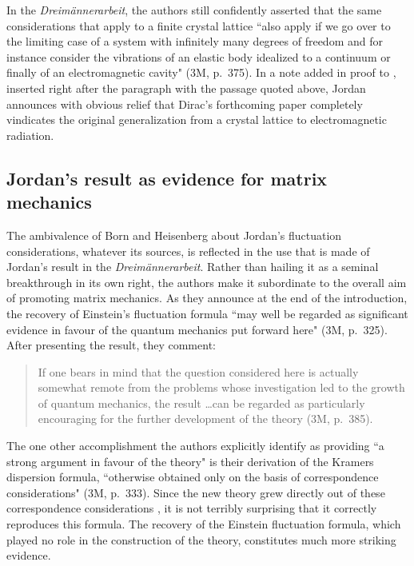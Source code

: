 \documentclass[12pt]{elsart}
\begin{document}
In the {\it Dreim\"annerarbeit}, the authors still confidently asserted that the same considerations that apply to a finite crystal lattice ``also apply if we go over to the limiting case of a system with infinitely many degrees of freedom and for instance consider the vibrations of an elastic body idealized to a continuum or finally of an electromagnetic cavity" (3M, p.\ 375). In a note added in proof to \citep{Jordan 1927b}, inserted right after the paragraph with the passage quoted above,  Jordan announces with obvious relief that Dirac's forthcoming paper completely vindicates the original generalization from a crystal lattice to electromagnetic radiation.

\subsection{Jordan's result as evidence for matrix mechanics}

The ambivalence of Born and Heisenberg about Jordan's fluctuation considerations, whatever its sources, is reflected in the use that is made of Jordan's result in the {\it Dreim\"annerarbeit}. Rather than hailing it as a seminal breakthrough in its own right, the authors make it subordinate to the overall aim of promoting matrix mechanics. As they announce at the end of the introduction, the recovery of Einstein's fluctuation formula ``may well be regarded as significant evidence in favour of the quantum mechanics put forward here" (3M, p.\ 325). After presenting the result, they comment: 
\begin{quotation}
If one bears in mind that the question considered here is actually somewhat remote from the problems whose investigation led to the growth of quantum mechanics, the result \ldots can be regarded as particularly encouraging for the further development of the theory (3M, p.\ 385). 
\end{quotation}
The one other accomplishment the authors explicitly identify as providing ``a strong argument in favour of the theory" is their derivation of the Kramers dispersion formula, ``otherwise obtained only on the basis of correspondence considerations" (3M, p.\ 333).  Since the new theory grew directly out of these correspondence considerations \citep{Duncan and Janssen}, it is not terribly surprising that it correctly reproduces this formula. The recovery of the Einstein fluctuation formula, which played no role in the construction of the theory, constitutes much more striking evidence.
\end{document}
